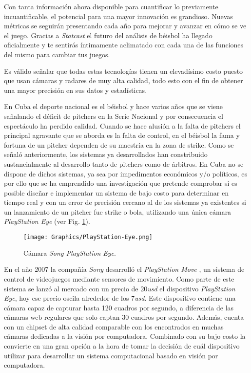 Con tanta información ahora disponible para cuantificar lo previamente incuantificable, el potencial para una mayor innovación es grandioso. Nuevas métricas se seguirán presentando cada año para mejorar y avanzar en cómo se ve el juego. Gracias a \textit{Statcast} el futuro del análisis de béisbol ha llegado oficialmente y te sentirás íntimamente aclimatado con cada una de las funciones del mismo para cambiar tus juegos.

Es válido señalar que todas estas tecnologías tienen un elevadísimo costo puesto que usan cámaras y radares de muy alta calidad, todo esto con el fin de obtener una mayor precisión en sus datos y estadísticas.

En Cuba el deporte nacional es el béisbol y hace varios años que se viene sañalando el déficit de pitchers en la Serie Nacional y por consecuencia el espectáculo ha perdido calidad. Cuando se hace alusión a la falta de pitchers el principal agravante que se aborda es la falta de control, en el béisbol la fama y fortuna de un pitcher dependen de su maestría en la zona de strike. Como se señaló anteriormente, los sistemas ya desarrollados han constribuido sustancialmente al desarrollo tanto de pitchers como de árbitros. En Cuba no se dispone de dichos sistemas, ya sea por impedimentos económicos y/o políticos, es por ello que se ha emprendido una investigación que pretende comprobar si es posible diseñar e implementar un sistema de bajo costo para determinar en tiempo real y con un error de precisión cercano al de los sistemas ya existentes si un lanzamiento de un pitcher fue strike o bola, utilizando una única cámara \textit{PlayStation Eye} \cite{PlayStationEye} (ver Fig. \ref{fig:PlayStationEye}).

\begin{figure}[h!]
    \centering
    \texttt{[image: Graphics/PlayStation-Eye.png]}
    \caption{Cámara \textit{Sony PlayStation Eye}.}
    \label{fig:PlayStationEye}
\end{figure}

En el año 2007 la compañía \textit{Sony} desarrolló el \textit{PlayStation Move} \cite{PlayStationMove}, un sistema de control de videojuegos mediante sensores de movimiento. Como parte de este sistema se lanzó al mercado con un precio de 20\textit{usd} el dispositivo \textit{PlayStation Eye}, hoy ese precio oscila alrededor de los 7\textit{usd}. Este dispositivo contiene una cámara capaz de capturar hasta 120 cuadros por segundo, a diferencia de las cámaras web regulares que solo captan 30 cuadros por segundo. Además, cuenta con un chipset de alta calidad comparable con los encontrados en muchas cámaras dedicadas a la visión por computadora. Combinado con su bajo costo la convierte en una gran opción a la hora de tomar la decisión de cuál dispositivo utilizar para desarrollar un sistema computacional basado en visión por computadora.

